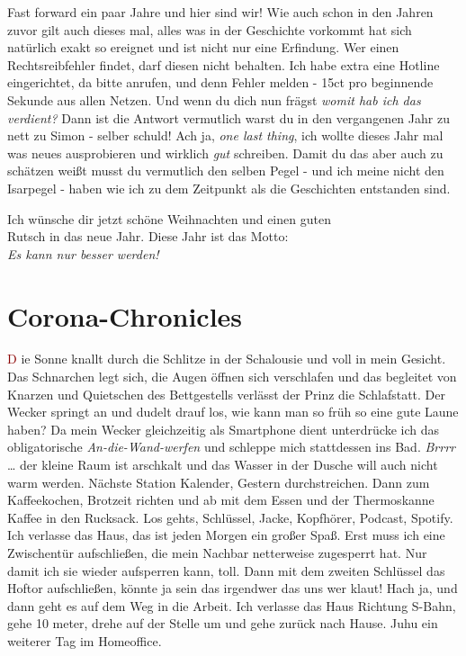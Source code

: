 \documentclass[11pt]{article}
\newcommand*\initfamily{\usefont{U}{GoudyIn}{xl}{n}}
\newcommand{\cb}[1]{\lettrine[lines=5]{\initfamily\textcolor{darkred}{#1}}{  }}
\begin{document}
\noindent Fast forward ein paar Jahre und hier sind wir! Wie auch
schon in den Jahren zuvor gilt auch dieses mal, alles was in der
Geschichte vorkommt hat sich natürlich exakt so ereignet und ist nicht
nur eine Erfindung. Wer einen Rechtsreibfehler findet, darf diesen
nicht behalten. Ich habe extra eine Hotline eingerichtet, da bitte
anrufen, und denn Fehler melden - 15ct pro beginnende Sekunde aus allen
Netzen. Und wenn du dich nun frägst \emph{womit hab ich das verdient?}
Dann ist die Antwort vermutlich warst du in den vergangenen Jahr zu nett
zu Simon - selber schuld! Ach ja, \emph{one last thing}, ich wollte dieses
Jahr mal was neues ausprobieren und wirklich \emph{gut} schreiben. Damit du
das aber auch zu schätzen weißt musst du vermutlich den selben Pegel -
und ich meine nicht den Isarpegel - haben wie ich zu dem Zeitpunkt als
die Geschichten entstanden sind.

\begin{center}
Ich wünsche dir jetzt schöne Weihnachten und einen guten\\
Rutsch in das neue Jahr. Diese Jahr ist das Motto:\\
\emph{Es kann nur besser werden!}
\end{center}

\setcounter{section}{0}
\renewcommand\thesection{Kapitel \arabic{section}:}
\section{Corona-Chronicles}
\label{sec:orgf467105}

\cb{D}ie Sonne knallt durch die Schlitze in der Schalousie und voll in
mein Gesicht. Das Schnarchen legt sich, die Augen öffnen sich
verschlafen und das begleitet von Knarzen und Quietschen des
Bettgestells verlässt der Prinz die Schlafstatt. Der Wecker springt an
und dudelt drauf los, wie kann man so früh so eine gute Laune haben?
Da mein Wecker gleichzeitig als Smartphone dient unterdrücke ich das
obligatorische \emph{An-die-Wand-werfen} und schleppe mich stattdessen ins
Bad. \emph{Brrrr} \dots{} der kleine Raum ist arschkalt und das Wasser in der
Dusche will auch nicht warm werden. Nächste Station Kalender, Gestern
durchstreichen. Dann zum Kaffeekochen, Brotzeit richten und ab mit dem
Essen und der Thermoskanne Kaffee in den Rucksack. Los gehts,
Schlüssel, Jacke, Kopfhörer, Podcast, Spotify. Ich verlasse das Haus,
das ist jeden Morgen ein großer Spaß. Erst muss ich eine Zwischentür
aufschließen, die mein Nachbar netterweise zugesperrt hat. Nur damit
ich sie wieder aufsperren kann, toll. Dann mit dem zweiten Schlüssel
das Hoftor aufschließen, könnte ja sein das irgendwer das uns wer
klaut! Hach ja, und dann geht es auf dem Weg in die Arbeit. Ich
verlasse das Haus Richtung S-Bahn, gehe 10 meter, drehe auf der Stelle
um und gehe zurück nach Hause. Juhu ein weiterer Tag im
Homeoffice. \newline
\end{document}
